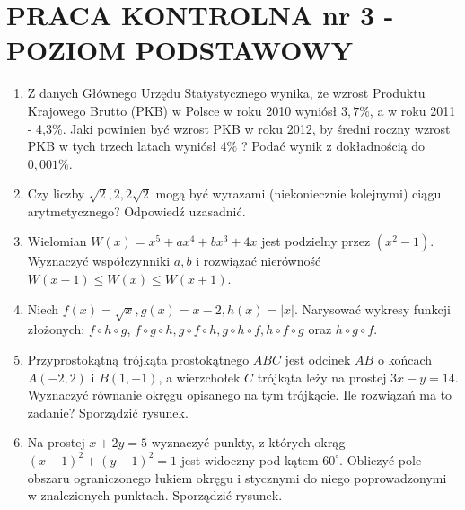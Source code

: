 \documentclass[10pt]{article}
\begin{document}
\section*{PRACA KONTROLNA nr 3 - POZIOM PODSTAWOWY}
\begin{enumerate}
  \item Z danych Głównego Urzędu Statystycznego wynika, że wzrost Produktu Krajowego Brutto (PKB) w Polsce w roku 2010 wyniósł $3,7 \%$, a w roku 2011 - 4,3\%. Jaki powinien być wzrost PKB w roku 2012, by średni roczny wzrost PKB w tych trzech latach wyniósł $4 \%$ ? Podać wynik z dokładnością do $0,001 \%$.
  \item Czy liczby $\sqrt{2}, 2,2 \sqrt{2}$ mogą być wyrazami (niekoniecznie kolejnymi) ciągu arytmetycznego? Odpowiedź uzasadnić.
  \item Wielomian $W(x)=x^{5}+a x^{4}+b x^{3}+4 x$ jest podzielny przez $\left(x^{2}-1\right)$. Wyznaczyć współczynniki $a, b$ i rozwiązać nierówność $W(x-1) \leqslant W(x) \leqslant W(x+1)$.
  \item Niech $f(x)=\sqrt{x}, g(x)=x-2, h(x)=|x|$. Narysować wykresy funkcji złożonych: $f \circ h \circ g$, $f \circ g \circ h, g \circ f \circ h, g \circ h \circ f, h \circ f \circ g$ oraz $h \circ g \circ f$.
  \item Przyprostokątną trójkąta prostokątnego $A B C$ jest odcinek $A B$ o końcach $A(-2,2)$ i $B(1,-1)$, a wierzchołek $C$ trójkąta leży na prostej $3 x-y=14$. Wyznaczyć równanie okręgu opisanego na tym trójkącie. Ile rozwiązań ma to zadanie? Sporządzić rysunek.
  \item Na prostej $x+2 y=5$ wyznaczyć punkty, z których okrąg $(x-1)^{2}+(y-1)^{2}=1$ jest widoczny pod kątem $60^{\circ}$. Obliczyć pole obszaru ograniczonego łukiem okręgu i stycznymi do niego poprowadzonymi w znalezionych punktach. Sporządzić rysunek.
\end{enumerate}
\end{document}
